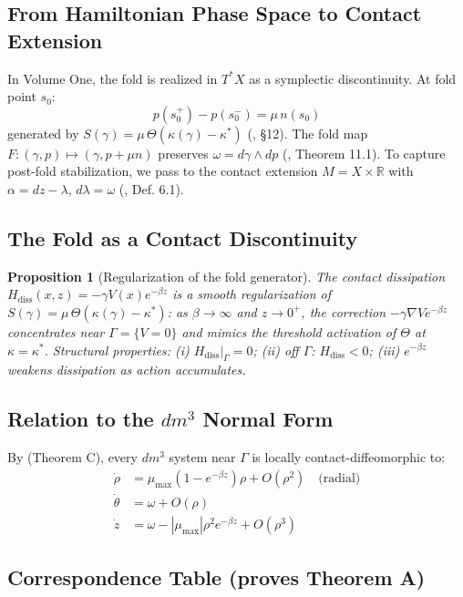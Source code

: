 \documentclass[11pt]{article}
\theoremstyle{boxed}
\newtheorem{proposition}[theorem]{Proposition}
\begin{document}
\subsection{From Hamiltonian Phase Space to Contact Extension}

In Volume One, the fold is realized in $T^{*}X$ as a symplectic discontinuity. At
fold point $s_0$:
\[
  p(s_0^{+}) - p(s_0^{-}) = \mu\, n(s_0)
\]
generated by $S(\gamma) = \mu\, \Theta(\kappa(\gamma) - \kappa^{*})$
(\cite{VolI}, \S 12). The fold map $F : (\gamma, p) \mapsto (\gamma, p + \mu n)$
preserves $\omega = d\gamma \wedge dp$ (\cite{VolI}, Theorem 11.1). To capture
post-fold stabilization, we pass to the contact extension $M = X \times \mathbb{R}$
with $\alpha = dz - \lambda$, $d\lambda = \omega$ (\cite{GCM}, Def. 6.1).

\subsection{The Fold as a Contact Discontinuity}

\begin{proposition}[Regularization of the fold generator]
The contact dissipation $H_{\mathrm{diss}}(x,z) = -\gamma V(x) e^{-\beta z}$ is a
smooth regularization of $S(\gamma) = \mu\, \Theta(\kappa(\gamma) - \kappa^{*})$:
as $\beta \to \infty$ and $z \to 0^{+}$, the correction $-\gamma \nabla V e^{-\beta z}$
concentrates near $\Gamma = \{V = 0\}$ and mimics the threshold activation of
$\Theta$ at $\kappa = \kappa^{*}$.
Structural properties: (i) $H_{\mathrm{diss}}|_{\Gamma} = 0$;
(ii) off $\Gamma$: $H_{\mathrm{diss}} < 0$;
(iii) $e^{-\beta z}$ weakens dissipation as action accumulates.
\end{proposition}

\subsection{Relation to the $dm^3$ Normal Form}

By \cite{GCM} (Theorem C), every $dm^3$ system near $\Gamma$ is locally
contact-diffeomorphic to:
\begin{align*}
\dot{\rho} &= \mu_{\max}(1 - e^{-\beta z})\rho + O(\rho^2) \quad\text{(radial)}\\
\dot{\theta} &= \omega + O(\rho)\\
\dot{z} &= \omega - |\mu_{\max}|\rho^2 e^{-\beta z} + O(\rho^3)
\end{align*}

\subsection{Correspondence Table (proves Theorem A)}
\end{document}
